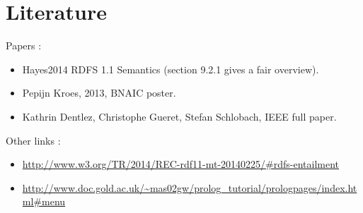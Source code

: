\documentclass{article}
\newenvironment{itemh}[0]{\begin{itemize}[label=$\heartsuit$, font=\color{gray} \small]}{\end{itemize}}
\begin{document}
\newpage

\section{Literature}
	Papers :
	\begin{itemh}
		\item Hayes2014 RDFS 1.1 Semantics (section 9.2.1 gives a fair overview).
		\item Pepijn Kroes, 2013, BNAIC poster.
		\item Kathrin Dentlez, Christophe Gueret, Stefan Schlobach, IEEE full paper.
	\end{itemh}
	Other links :
	\begin{itemh}
		\item\url{http://www.w3.org/TR/2014/REC-rdf11-mt-20140225/#rdfs-entailment}
		\item \url{http://www.doc.gold.ac.uk/~mas02gw/prolog_tutorial/prologpages/index.html#menu}
	\end{itemh}
\end{document}
